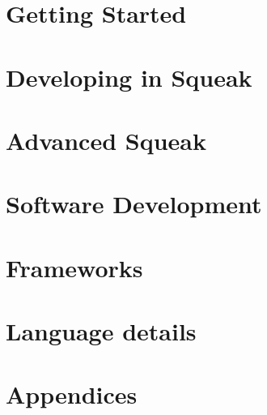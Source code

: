\documentclass[a4paper,10pt,twoside]{book}
\begin{document}
\part{Getting Started}




\part{Developing in Squeak}







\part{Advanced Squeak}


\part{Software Development}

%
%
%

\part{Frameworks}

%



\part{Language details}

%
%


\appendix
\part{Appendices}



{\small\raggedright\printindex}
\cleardoublepage
~ %
\cleardoublepage
~ %
\cleardoublepage
\end{document}
